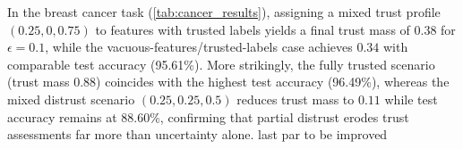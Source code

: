 In the breast cancer task (\cref{tab:cancer_results}), assigning a mixed trust
profile $(0.25, 0, 0.75)$ to features with trusted labels yields a final trust
mass of $0.38$ for $\epsilon=0.1$, while the vacuous-features/trusted-labels
case achieves $0.34$ with comparable test accuracy (95.61\%). More strikingly,
the fully trusted scenario (trust mass $0.88$) coincides with the highest test
accuracy (96.49\%), whereas the mixed distrust scenario $(0.25, 0.25, 0.5)$
reduces trust mass to $0.11$ while test accuracy remains at 88.60\%, confirming
that partial distrust erodes trust assessments far more than uncertainty alone.
\todo last par to be improved 
